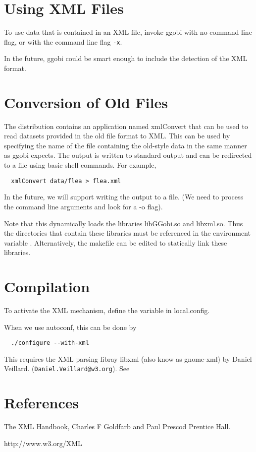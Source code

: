 \documentclass{article}
\begin{document}
\section{Using XML Files}
To use data that is contained in an XML file, invoke ggobi with no
command line flag, or with the command line flag \texttt{-x}.

In the future, ggobi could be smart enough to include the detection of
the XML format.

\section{Conversion of Old Files}
The distribution contains an application named xmlConvert that can be
used to read datasets provided in the old file format to XML.  This
can be used by specifying the name of the file containing the
old-style data in the same manner as ggobi expects.
The output is written to standard output
and can be redirected to a file using basic shell commands.
For example,
\begin{verbatim}
  xmlConvert data/flea > flea.xml
\end{verbatim}
In the future, we will support writing the output to a file. (We need
to process the command line arguments and look for a -o flag).


Note that this dynamically loads the libraries libGGobi.so and
libxml.so.  Thus the directories that contain these libraries must be
referenced in the environment variable 
.
Alternatively, the makefile can be edited to statically link these
libraries.


\section{Compilation}
To activate the XML mechanism, define the variable
 in  local.config.

When we use autoconf, this can be done by
\begin{verbatim}
  ./configure --with-xml
\end{verbatim}

This requires the XML parsing libray libxml (also know as gnome-xml) by Daniel Veillard.
(\texttt{Daniel.Veillard@w3.org}).
See 
\section{References}
The XML Handbook, Charles F Goldfarb and Paul Prescod
 Prentice Hall.

http://www.w3.org/XML
\end{document}
